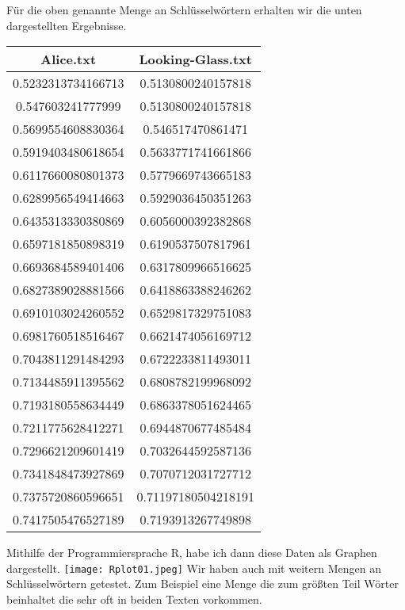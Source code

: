 \documentclass{article}
\begin{document}
 Für die oben genannte Menge an Schlüsselwörtern erhalten wir die unten dargestellten Ergebnisse.\newline\newline
 \begin{center}
\begin{tabular}{|c|c|}
    \hline
    \textbf{Alice.txt} & \textbf{Looking-Glass.txt} \\
    \hline
    0.5232313734166713 & 0.5130800240157818 \\
    0.547603241777999 & 0.5130800240157818 \\
    0.5699554608830364 & 0.546517470861471 \\
    0.5919403480618654 & 0.5633771741661866 \\
    0.6117660080801373 & 0.5779669743665183 \\
    0.6289956549414663 & 0.5929036450351263 \\
    0.6435313330380869 & 0.6056000392382868 \\
    0.6597181850898319 & 0.6190537507817961 \\
    0.6693684589401406 & 0.6317809966516625 \\
    0.6827389028881566 & 0.6418863388246262 \\
    0.6910103024260552 & 0.6529817329751083 \\
    0.6981760518516467 & 0.6621474056169712 \\
    0.7043811291484293 & 0.6722233811493011 \\
    0.7134485911395562 & 0.6808782199968092 \\
    0.7193180558634449 & 0.6863378051624465 \\
    0.7211775628412271 & 0.6944870677485484 \\
    0.7296621209601419 & 0.7032644592587136 \\
    0.7341848473927869 & 0.7070712031727712 \\
    0.7375720860596651 & 0.71197180504218191 \\
    0.7417505476527189 & 0.7193913267749898 \\
    \hline
\end{tabular}
\end{center} 
\noindent Mithilfe der Programmiersprache R, habe ich dann diese Daten als Graphen dargestellt.\newline
\texttt{[image: Rplot01.jpeg]}
Wir haben auch mit weitern Mengen an Schlüsselwörtern getestet. Zum Beispiel eine Menge die zum größten Teil Wörter beinhaltet die sehr oft in beiden Texten vorkommen.
\end{document}
